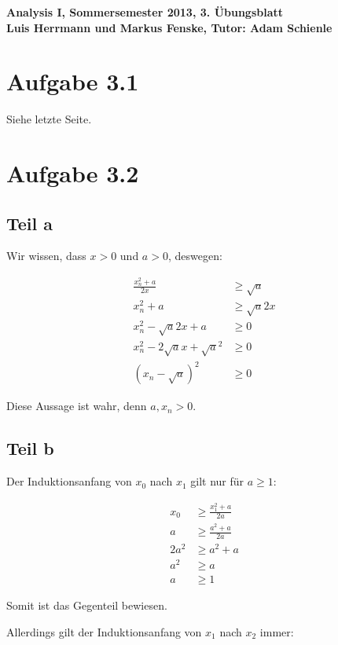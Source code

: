 \documentclass[a4paper,german,12pt,smallheadings]{scrartcl}
\begin{document}
\begin{center}
\bfseries %
\sffamily %
\vspace{-40pt}
Analysis I, Sommersemester 2013, 3. Übungsblatt \\
Luis Herrmann und Markus Fenske, Tutor: Adam Schienle
\vspace{-10pt}
\end{center}

\section*{Aufgabe 3.1}

Siehe letzte Seite.

\section*{Aufgabe 3.2}
\subsection*{Teil a}
Wir wissen, dass $x > 0$ und $a > 0$, deswegen:

\begin{align*}
  \frac{x_n^2 + a}{2x} &\ge \sqrt{a} \\
  x_n^2 + a &\ge \sqrt{a}2x \\
  x_n^2 -\sqrt{a}2x+ a &\ge 0 \\
  x_n^2 - 2\sqrt{a}x+ \sqrt{a}^2 &\ge 0 \\
  (x_n - \sqrt{a})^2 &\ge 0
\end{align*}

Diese Aussage ist wahr, denn $a,x_n > 0$.

\subsection*{Teil b}
Der Induktionsanfang von $x_0$ nach $x_1$ gilt nur für $a \ge 1$:

\begin{align*}
  x_0 &\ge \frac{x_1^2 + a}{2a} \\
  a &\ge \frac{a^2 + a}{2a} \\
  2a^2 &\ge a^2 + a \\
  a^2 &\ge a \\
  a &\ge 1
\end{align*}

Somit ist das Gegenteil bewiesen.

Allerdings gilt der Induktionsanfang von $x_1$ nach $x_2$ immer:
\end{document}
